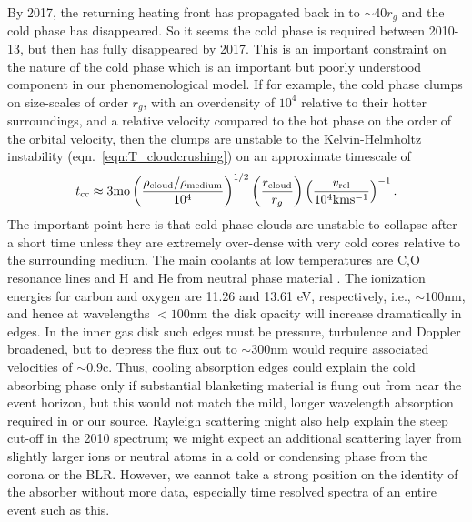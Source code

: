 \documentclass[a4paper,fleqn,usenatbib]{mnras}
\begin{document}
By 2017, the returning heating front has propagated back in to $\sim$40$r_{g}$ and the cold phase has disappeared. So it seems the cold phase is required between 2010-13, but then has fully disappeared by 2017. This is an important constraint on the nature of the cold phase which is an important but poorly understood component in our phenomenological model. If for example, the cold phase clumps on size-scales of order $r_g$, with an overdensity of $10^{4}$ relative to their hotter surroundings, and a relative velocity compared to the hot phase on the order of the orbital velocity, then the clumps are unstable to the Kelvin-Helmholtz instability
(eqn.~\ref{eqn:T_cloudcrushing}) on an
approximate timescale of
\begin{equation}
t_{{\rm cc}} \approx 3{\rm mo} 
               \left( \frac{\rho_{\rm{cloud}}/\rho_{\rm{medium}}}{10^{4}}   \right)^{1/2}
               \left( \frac{r_{\rm cloud}}{r_{g}}\right) 
              \left( \frac{v_{\rm rel}}{10^{4}\rm{km s^{-1}}} \right)^{-1}.
\end{equation}
The important point here is that cold phase clouds are unstable to collapse after a short time unless they are extremely over-dense with very cold cores relative to the surrounding medium. The main coolants at low temperatures are C,O resonance lines and H and He from neutral phase material \citep[see e.g., Fig. 18 in ][]{Sutherland_Dopita1993}. The ionization energies for carbon and oxygen are 11.26 and 13.61 eV, respectively, i.e., $\sim 100$nm, and hence at wavelengths $<100$nm the disk opacity will increase dramatically in edges. In the inner gas disk such edges must be pressure, turbulence and Doppler broadened, but to depress the flux out to $\sim 300$nm would require associated velocities of $\sim 0.9$c. Thus, cooling absorption edges could explain the cold absorbing phase only if substantial blanketing material is flung out from near the event horizon, but this would not match the mild, longer wavelength absorption required in \citep{Guo2016} or our source. Rayleigh scattering might also help explain the steep cut-off in the 2010 spectrum; we might expect an additional scattering layer from slightly larger ions or neutral atoms in a cold or condensing phase from the corona or the BLR. However, we cannot take a strong position on the identity of the absorber without more data, especially time resolved spectra of an entire event such as this.
\end{document}
